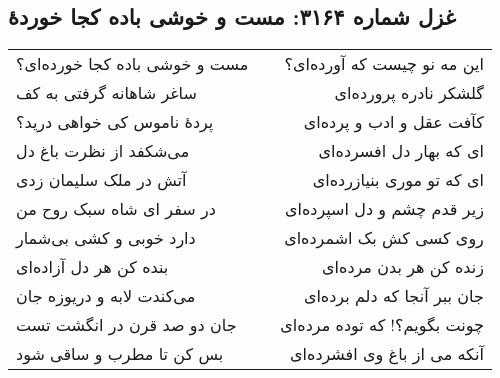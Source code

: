 \begin{center}
\section*{غزل شماره ۳۱۶۴: مست و خوشی باده کجا خوردهٔ}
\label{sec:3164}
\begin{longtable}{l p{0.5cm} r}
مست و خوشی باده کجا خورده‌ای؟
&&
این مه نو چیست که آورده‌ای؟
\\
ساغر شاهانه گرفتی به کف
&&
گلشکر نادره پرورده‌ای
\\
پردهٔ ناموس کی خواهی درید؟
&&
کآفت عقل و ادب و پرده‌ای
\\
می‌شکفد از نظرت باغ دل
&&
ای که بهار دل افسرده‌ای
\\
آتش در ملک سلیمان زدی
&&
ای که تو موری بنیازرده‌ای
\\
در سفر ای شاه سبک روح من
&&
زیر قدم چشم و دل اسپرده‌ای
\\
دارد خوبی و کشی بی‌شمار
&&
روی کسی کش بک اشمرده‌ای
\\
بنده کن هر دل آزاده‌ای
&&
زنده کن هر بدن مرده‌ای
\\
می‌کندت لابه و دریوزه جان
&&
جان ببر آنجا که دلم برده‌ای
\\
جان دو صد قرن در انگشت تست
&&
چونت بگویم؟! که توده مرده‌ای
\\
بس کن تا مطرب و ساقی شود
&&
آنکه می از باغ وی افشرده‌ای
\\
\end{longtable}
\end{center}
